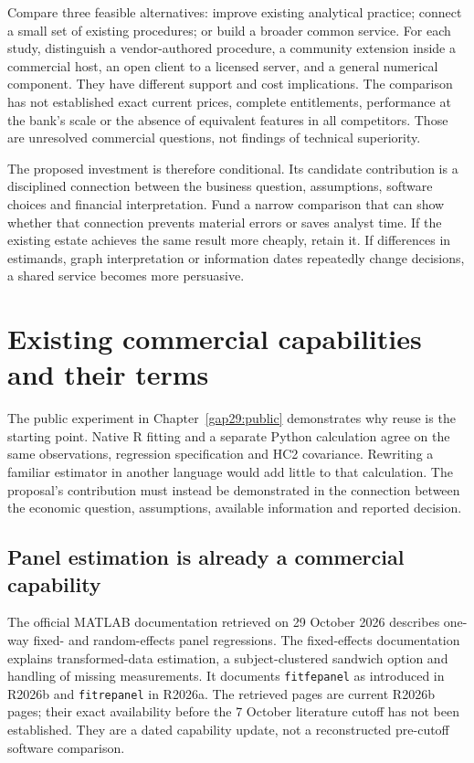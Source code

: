 Compare three feasible alternatives: improve existing analytical practice;
connect a small set of existing procedures; or build a broader common service.
For each study, distinguish a vendor-authored procedure, a community extension
inside a commercial host, an open client to a licensed server, and a general
numerical component. They have different support and cost implications. The
comparison has not established exact current prices, complete entitlements,
performance at the bank's scale or the absence of equivalent features in all
competitors. Those are unresolved commercial questions, not findings of
technical superiority.

The proposed investment is therefore conditional. Its candidate contribution
is a disciplined connection between the business question, assumptions,
software choices and financial interpretation. Fund a narrow comparison that
can show whether that connection prevents material errors or saves analyst
time. If the existing estate achieves the same result more cheaply, retain it.
If differences in estimands, graph interpretation or information dates repeatedly
change decisions, a shared service becomes more persuasive.



\section{Existing commercial capabilities and their terms}
\label{gap29:software-followup}
The public experiment in Chapter~\ref{gap29:public} demonstrates why reuse is the starting point. Native
R fitting and a separate Python calculation agree on the same observations,
regression specification and HC2 covariance. Rewriting a familiar estimator
in another language would add little to that calculation. The proposal's
contribution must instead be demonstrated in the connection between the
economic question, assumptions, available information and reported decision.

\subsection{Panel estimation is already a commercial capability}
The official MATLAB documentation retrieved on 29 October 2026 describes
one-way fixed- and random-effects panel regressions. The fixed-effects
documentation explains transformed-data estimation, a subject-clustered
sandwich option and handling of missing measurements. It documents
\texttt{fitfepanel} as introduced in R2026b and
\texttt{fitrepanel} in R2026a. The retrieved pages are current R2026b pages;
their exact availability before the 7 October literature cutoff has not been
established. They are a dated capability update, not a reconstructed
pre-cutoff software comparison. \citep{gap29matlab}

